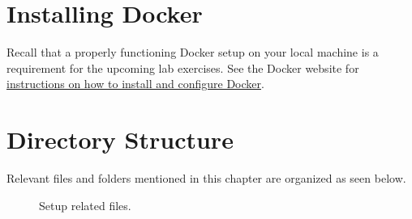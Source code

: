 \section{Installing Docker}

\justifying
Recall that a properly functioning Docker setup on your local machine is a requirement for the upcoming
lab exercises. See the Docker website for 
\href{https://docs.docker.com/get-docker/}{instructions on how to install and configure Docker}. 



\section{Directory Structure}

\justifying
Relevant files and folders mentioned in this chapter are organized as seen below.

\begin{figure}[!htb]
	\centering
	
	\caption{Setup related files.}
	\label{setupfiles}
\end{figure}

